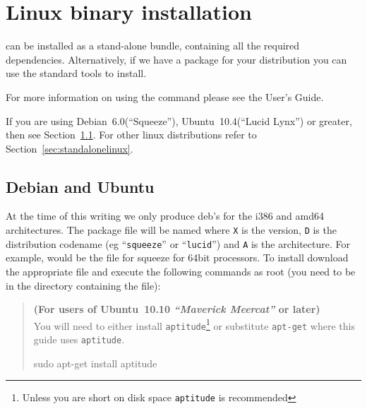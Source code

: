 %
%
%

\section{Linux binary installation}
\label{sec:binlinux}

\esfinley can be installed as a stand-alone bundle, containing all the required dependencies.
Alternatively, if we have a package for your distribution you can use the standard tools to install.


For more information on using the  command please see the User's Guide.

If you are using Debian~6.0(``Squeeze''), Ubuntu~10.4(``Lucid Lynx'') or greater, then see Section~\ref{sec:debian}.
For other linux distributions refer to Section~\ref{sec:standalonelinux}.

\subsection{Debian and Ubuntu}\label{sec:debian}

At the time of this writing we only produce deb's for the i386 and amd64 architectures.
The package file will be named  where \texttt{X} is the version, \texttt{D} 
is the distribution codename (eg ``\texttt{squeeze}'' or ``\texttt{lucid}'') and \texttt{A} is the architecture.
For example,  would be the file for squeeze for 64bit processors.
To install \esfinley download the appropriate  file and execute the following 
commands as root (you need to be in the directory containing the file):

\begin{verse}
\textbf{(For users of Ubuntu~10.10 \textit{``Maverick Meercat''} or later)}\\
You will need to either install \texttt{aptitude}\footnote{Unless you are short on disk space \texttt{aptitude} is recommended} or substitute \texttt{apt-get} where this guide uses \texttt{aptitude}.
\begin{shellCode}
sudo apt-get install aptitude
\end{shellCode}
\end{verse}

